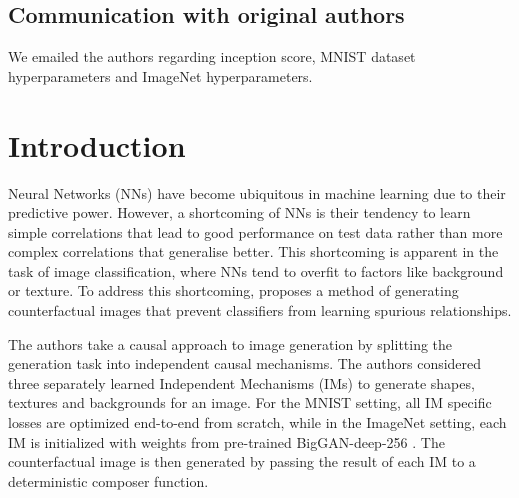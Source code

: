 \subsection*{Communication with original authors}
We emailed the authors regarding inception score, MNIST dataset hyperparameters and ImageNet hyperparameters. %

\newpage





\section{Introduction}

Neural Networks (NNs) have become ubiquitous in machine learning due to their predictive power. However, a shortcoming of NNs is their tendency to learn simple correlations that lead to good performance on test data rather than more complex correlations that generalise better. This shortcoming is apparent in the task of image classification, where NNs tend to overfit to factors like background or texture. To address this shortcoming, \citep{sauer2021counterfactual} proposes a method of generating counterfactual images that prevent classifiers from learning spurious relationships.


The authors take a causal approach to image generation by splitting the generation task into independent causal mechanisms. The authors considered three separately learned Independent Mechanisms (IMs) to generate shapes, textures and backgrounds for an image. For the MNIST setting, all IM specific losses are optimized end-to-end from scratch, while in the ImageNet setting, each IM is initialized with weights from pre-trained BigGAN-deep-256 \citep{brock2019large}. The counterfactual image is then generated by passing the result of each IM to a deterministic composer function.

